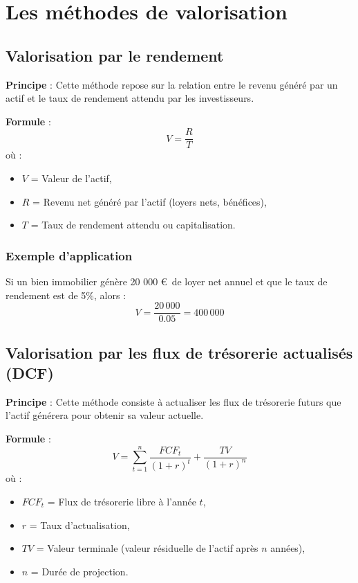 \documentclass[a4paper, 12pt]{report}
\begin{document}
	
	\chapter{Les méthodes de valorisation}
	
\section{Valorisation par le rendement}
	\textbf{Principe} : Cette méthode repose sur la relation entre le revenu généré par un actif et le taux de rendement attendu par les investisseurs.  
	
	\textbf{Formule} :  
	\[
	V = \frac{R}{T}
	\]  
	où :  
	\begin{itemize}
		\item \(V\) = Valeur de l’actif,
		\item \(R\) = Revenu net généré par l'actif (loyers nets, bénéfices),
		\item \(T\) = Taux de rendement attendu ou capitalisation.
	\end{itemize}
	
\subsection{Exemple d'application}
  
	Si un bien immobilier génère 20 000 \euro~de loyer net annuel et que le taux de rendement est de 5\%, alors :  
	\[
	V = \frac{20\,000}{0.05} = 400\,000
	\]
	
\section{ Valorisation par les flux de trésorerie actualisés (DCF)}
	\textbf{Principe} : Cette méthode consiste à actualiser les flux de trésorerie futurs que l’actif générera pour obtenir sa valeur actuelle.  
	
	\textbf{Formule} :  
	\[
	V = \sum_{t=1}^{n} \frac{FCF_t}{(1 + r)^t} + \frac{TV}{(1 + r)^n}
	\]  
	où :  
	\begin{itemize}
		\item \(FCF_t\) = Flux de trésorerie libre à l’année \(t\),
		\item \(r\) = Taux d’actualisation,
		\item \(TV\) = Valeur terminale (valeur résiduelle de l’actif après \(n\) années),
		\item \(n\) = Durée de projection.
	\end{itemize}
	
\end{document}
